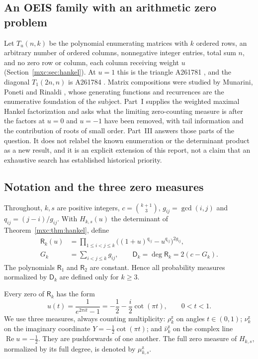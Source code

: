 \documentclass[11pt]{article}
\numberwithin{equation}{section}
\theoremstyle{definition}
\theoremstyle{remark}
\newcommand{\hzrho}{\rho^{\mathrm z}}
\newcommand{\hznu}{\nu^{\mathrm z}}
\newcommand{\hzhnu}{\widehat\nu^{\mathrm z}}
\newcommand{\hzmu}{\mu^{\mathrm z}}
\begin{document}
\subsection{An OEIS family with an arithmetic zero problem}
Let $T_u(n,k)$ be the polynomial enumerating matrices with $k$ ordered
rows, an arbitrary number of ordered columns, nonnegative integer entries,
total sum $n$, and no zero row or column, each column receiving weight $u$
(Section~\ref{mxc:sec:hankel}). At $u=1$ this is the triangle A261781
\cite{oeis781}, and the diagonal $T_1(2n,n)$ is A261784 \cite{oeis784}.
Matrix compositions were studied by Munarini, Poneti and Rinaldi
\cite{mpr2009}, whose generating functions and recurrences are the
enumerative foundation of the subject. Part~I supplies the weighted
maximal Hankel factorization and asks what the limiting zero-counting
measure is after the factors at $u=0$ and $u=-1$ have been removed, with
tail information and the contribution of roots of small order. Part~III
answers those parts of the question. It does not relabel the known
enumeration or the determinant product as a new result, and it is an
explicit extension of this report, not a claim that an exhaustive search
has established historical priority.

\subsection{Notation and the three zero measures}
Throughout, $k,s$ are positive integers, $c=\binom{k+1}3$,
$g_{ij}=\gcd(i,j)$ and $q_{ij}=(j-i)/g_{ij}$. With $H_{k,s}(u)$ the
determinant of Theorem~\ref{mxc:thm:hankel}, define
\begin{align}
 \mathsf R_k(u)&=\prod_{1\le i<j\le k}
       \bigl((1+u)^{q_{ij}}-u^{q_{ij}}\bigr)^{2g_{ij}},
       \label{mxc:hz:eq:reduced-product}\\
 G_k&=\sum_{i<j\le k}g_{ij},\qquad
 \mathsf D_k=\deg\mathsf R_k=2(c-G_k).\label{mxc:hz:eq:degree}
\end{align}
The polynomials $\mathsf R_1$ and $\mathsf R_2$ are constant. Hence all
probability measures normalized by $\mathsf D_k$ are defined only for
$k\ge3$.

Every zero of $\mathsf R_k$ has the form
\begin{equation}\label{mxc:hz:eq:mobius-map}
 u(t)=\frac1{e^{2\pi it}-1}
     =-\frac12-\frac{i}{2}\cot(\pi t),\qquad 0<t<1.
\end{equation}
We use three measures, always counting multiplicity: $\hzrho_k$ on angles
$t\in(0,1)$; $\hznu_k$ on the imaginary coordinate
$Y=-\frac12\cot(\pi t)$; and $\hzhnu_k$ on the complex line
$\operatorname{Re}u=-\frac12$. They are pushforwards of one another. The
full zero measure of $H_{k,s}$, normalized by its full degree, is denoted
by $\hzmu_{k,s}$.
\end{document}
